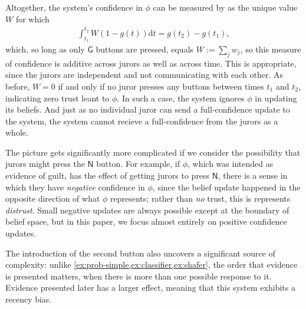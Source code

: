 \begin{example}
Altogether, the system's confidence in $\phi$ can be measured by
as the unique value $W$ for which
\begin{align*}
	\int_{t_1}^{t_2} W (1-g(t)) \mathrm d t =
	 g(t_2) - g(t_1),
\end{align*}
which, so long as only $\mathsf G$ buttons are pressed, equals
$W := \sum_{j} w_j$, so this measure of confidence is additive 
across jurors as well as across time. 
This is appropriate, since the jurors are independent and 
not communicating with each other.
As before, $W = 0$ if and only if no juror presses any buttons between times $t_1$ and $t_2$,
indicating zero trust leant to $\phi$. In such a case, the system ignores $\phi$ in updating its beliefs.
And just as no individual juror can send a full-confidence update to the system,
	the system cannot recieve a full-confidence from the jurors as a whole.
	
The picture gets significantly more complicated if we consider the possibility
that jurors might press the $\mathsf N$ button. For example, if $\phi$, which was intended
as evidence of guilt, has the effect of getting jurors to press $\mathsf N$, there is a sense
in which they have \emph{negative} confidence in $\phi$, since the belief update happened in the opposite direction of what $\phi$ represents; rather than \emph{no} trust, this is represents \emph{distrust}. 
Small negative updates are always possible except at the boundary of belief space, but in this paper, we focus almost entirely on positive confidence updates.

The introduction of the second button also uncovers a significant source of complexity:
unlike \cref{ex:prob-simple,ex:classifier,ex:shafer}, 
the order that evidence is presented matters, when there is more than one possible response to it.
Evidence presented later has a larger effect,
meaning that this system exhibits a recency bias.


\end{example}
